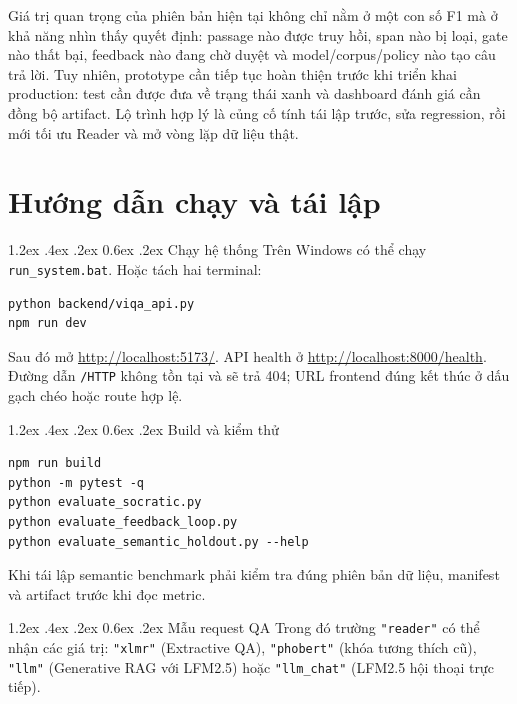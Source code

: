 \documentclass[12pt,a4paper,oneside]{report}
\makeatletter
\renewcommand\section{\@startsection {section}{1}{\z@}%
  {1.2ex \@plus .4ex \@minus .2ex}%
  {0.6ex \@plus .2ex}%
  {\normalfont\Large\bfseries}}
\newcommand{\code}[1]{\texttt{#1}}
\makeatother
\begin{document}
Giá trị quan trọng của phiên bản hiện tại không chỉ nằm ở một con số F1 mà ở khả năng
nhìn thấy quyết định: passage nào được truy hồi, span nào bị loại, gate nào thất bại,
feedback nào đang chờ duyệt và model/corpus/policy nào tạo câu trả lời. Tuy nhiên,
prototype cần tiếp tục hoàn thiện trước khi triển khai production: test cần được đưa về trạng thái xanh và dashboard đánh giá cần đồng bộ artifact. Lộ trình hợp lý là củng cố tính tái lập trước, sửa regression, rồi mới tối ưu Reader và mở vòng lặp dữ liệu thật.

\appendix
\chapter{Hướng dẫn chạy và tái lập}

\section{Chạy hệ thống}
Trên Windows có thể chạy \code{run\_system.bat}. Hoặc tách hai terminal:
\begin{lstlisting}[style=viqa]
python backend/viqa_api.py
npm run dev
\end{lstlisting}
Sau đó mở \url{http://localhost:5173/}. API health ở
\url{http://localhost:8000/health}. Đường dẫn \code{/HTTP} không tồn tại và sẽ trả
404; URL frontend đúng kết thúc ở dấu gạch chéo hoặc route hợp lệ.

\section{Build và kiểm thử}
\begin{lstlisting}[style=viqa]
npm run build
python -m pytest -q
python evaluate_socratic.py
python evaluate_feedback_loop.py
python evaluate_semantic_holdout.py --help
\end{lstlisting}
Khi tái lập semantic benchmark phải kiểm tra đúng phiên bản dữ liệu, manifest và artifact trước khi đọc metric.

\section{Mẫu request QA}
\noindent{}
\vspace{0.4em}
\noindent Trong đó trường \code{"reader"} có thể nhận các giá trị: \code{"xlmr"} (Extractive QA), \code{"phobert"} (khóa tương thích cũ), \code{"llm"} (Generative RAG với LFM2.5) hoặc \code{"llm\_chat"} (LFM2.5 hội thoại trực tiếp).
\end{document}
